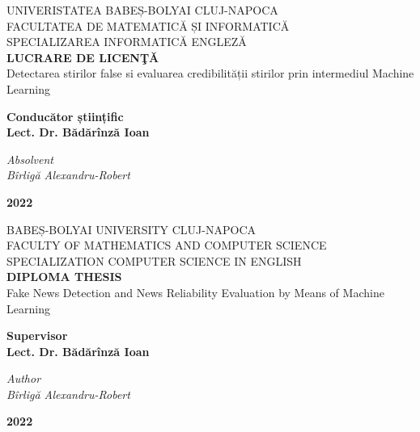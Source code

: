 \begin{titlepage}
  \begin{center}
    \normalsize{
      {UNIVERISTATEA BABEȘ-BOLYAI CLUJ-NAPOCA}\\
      {FACULTATEA DE MATEMATICĂ ȘI INFORMATICĂ}\\
      {SPECIALIZAREA INFORMATICĂ ENGLEZĂ}
    }\\
    [2.5cm]
    \Large{\textbf{LUCRARE DE LICENŢĂ}}\\
    [0.75cm]
    \Huge{ Detectarea stirilor false si evaluarea credibilității stirilor prin intermediul Machine Learning }\\
    [2.5cm]
  \end{center}

  \begin{flushleft}
    \large{
      {\textbf{Conducător științific}}\\
      {\textbf{Lect. Dr. Bădărînză Ioan}}
    }\\
    [1cm]
  \end{flushleft}

  \begin{flushright}
    \large{
      {\textit{Absolvent}}\\
      {\textit{Bîrligă Alexandru-Robert}}
    }\\
    [2cm]
  \end{flushright}

  \begin{center}
    \large{\textbf{2022}}
  \end{center}
\end{titlepage}

\begin{titlepage}
  \begin{center}
    \normalsize{
      {BABEȘ-BOLYAI UNIVERSITY CLUJ-NAPOCA}\\
      {FACULTY OF MATHEMATICS AND COMPUTER SCIENCE}\\
      {SPECIALIZATION COMPUTER SCIENCE IN ENGLISH}
    }\\
    [2.5cm]
    \Large{\textbf{DIPLOMA THESIS}}\\
    [0.75cm]
    \Huge{Fake News Detection and News Reliability Evaluation by Means of Machine Learning}\\
    [2.5cm]
  \end{center}

  \begin{flushleft}
    \large{
      {\textbf{Supervisor}}\\
      {\textbf{Lect. Dr. Bădărînză Ioan}}
    }\\
    [1cm]
  \end{flushleft}

  \begin{flushright}
    \large{
      {\textit{Author}}\\
      {\textit{Bîrligă Alexandru-Robert}}
    }\\
    [3cm]
  \end{flushright}

  \begin{center}
    \large{\textbf{2022}}
  \end{center}
\end{titlepage}